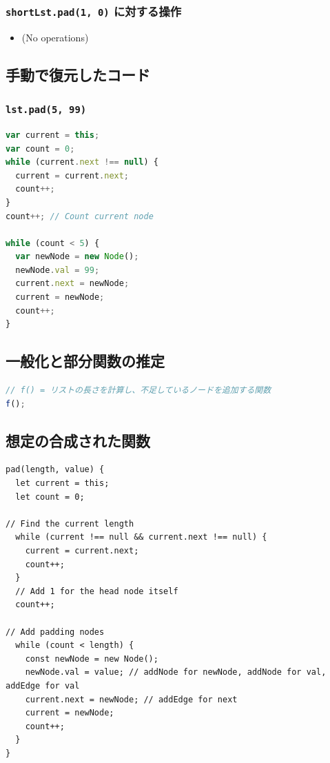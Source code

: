 \documentclass{article}
\begin{document}
\subsubsection{\texttt{shortLst.pad(1, 0)} に対する操作}
\begin{itemize}
  \item (No operations)
\end{itemize}

\subsection{手動で復元したコード}

\subsubsection{\texttt{lst.pad(5, 99)}}
\begin{lstlisting}[language=JavaScript]
var current = this;
var count = 0;
while (current.next !== null) {
  current = current.next;
  count++;
}
count++; // Count current node

while (count < 5) {
  var newNode = new Node();
  newNode.val = 99;
  current.next = newNode;
  current = newNode;
  count++;
}
\end{lstlisting}

\subsection{一般化と部分関数の推定}

\begin{lstlisting}[language=JavaScript]
// f() = リストの長さを計算し、不足しているノードを追加する関数
f();
\end{lstlisting}

\subsection{想定の合成された関数}
\begin{lstlisting}
pad(length, value) {
  let current = this;
  let count = 0;

// Find the current length
  while (current !== null && current.next !== null) {
    current = current.next;
    count++;
  }
  // Add 1 for the head node itself
  count++;

// Add padding nodes
  while (count < length) {
    const newNode = new Node();
    newNode.val = value; // addNode for newNode, addNode for val, addEdge for val
    current.next = newNode; // addEdge for next
    current = newNode;
    count++;
  }
}
\end{lstlisting}
\end{document}
